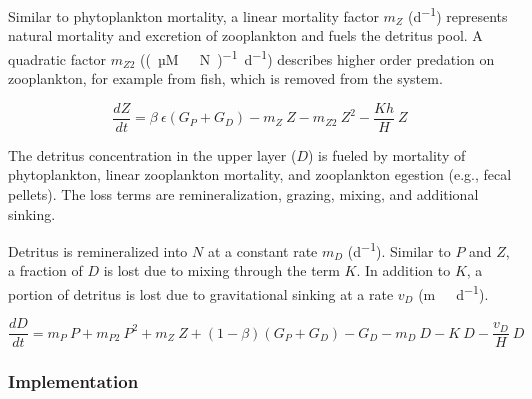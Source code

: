 \documentclass[journal abbreviation, manuscript]{copernicus}
\begin{document}
Similar to phytoplankton mortality, a linear mortality factor $m_Z$ (\unit{d^{-1}}) represents natural mortality and excretion of zooplankton and fuels the detritus pool. A quadratic factor $m_{Z2}$ (\unit{(µM \ N)^{-1} d^{−1}}) describes higher order predation on zooplankton, for example from fish, which is removed from the system. 

\begin{equation}
    \label{Eq:EmpowerZoo}
    \frac{d Z}{d t} =
    \beta \ \epsilon(G_P + G_D) %
    - m_Z \ Z %
    - m_{Z2} \ Z^2 %
    - \frac{K h}{H} \ Z %
\end{equation}


The detritus concentration in the upper layer ($D$) is fueled by mortality of phytoplankton, linear zooplankton mortality, and zooplankton egestion (e.g., fecal pellets). The loss terms are remineralization, grazing, mixing, and additional sinking. 

Detritus is remineralized into $N$ at a constant rate $m_D$ (\unit{d^{−1}}). Similar to $P$ and $Z$, a fraction of $D$ is lost due to mixing through the term $K$. In addition to $K$, a portion of detritus is lost due to gravitational sinking at a rate $v_D$ (\unit{m\ d^{−1}}). 

\begin{equation}
    \label{Eq:EmpowerDet}
    \frac{d D}{d t} = 
    m_P \ P %
    + m_{P2} \ P^2 %
    + m_Z \ Z %
    + (1 - \beta)(G_P + G_D) %
    - G_D %
    - m_D \ D %
    - K \ D %
    - \frac{v_D}{H} \ D %
\end{equation}






\subsubsection{Implementation}
\label{Section:EMPOWERImplementation}
\end{document}
